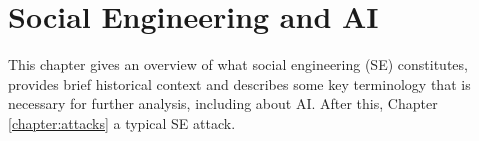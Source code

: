 

    

\chapter{Social Engineering and AI\label{chapter:definition}}
\begin{comment}

Guides:
    - Page limit 1-2 pages
    - Context and terminology (käsitteet), challenges and measurement criteria, values, research question analysis
    - Second to last paragraph contains the research question (RQ) and the results

TODO:
    [ ] Who is this thesis for
    [ ] Why should you read my thesis
    [ ] What is the research question and how it is answered
    [ ] How is this thesis organized, what is covered and what is deliberaly not covered and in what chapters (outline)

What to cover:
    - What is cybersecurity and why it's of paramount importance
    - What is social engineering
        - Brief history of social engineering
            - Phishing in 1996 via AOL
    - Attacks, classical social engineering attacks
        - Phishing, vishing, smishing
        - Tailgating
        - Baiting (not always considered SE)
        - Dumpster diving (not always considered SE)
    - Countermeasures, classical
        - User awareness & training programs
        - Company policy & company culture
        - Real-time threat detection
        - Vulnerability detection
    - Typical challenges
    - Motives for cybercrimes
        - Hard(er) to detect?
        - "Easy" wins?

Literature:
    - Defining Social Engineering in Cybersecurity

\end{comment}


This chapter gives an overview of what social engineering (SE) constitutes, provides brief historical context and describes some key terminology that is necessary for further analysis, including about AI. After this, Chapter \ref{chapter:attacks}  a typical SE attack.

